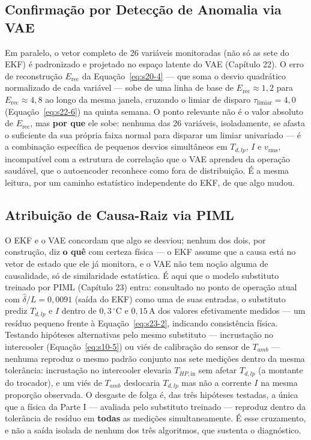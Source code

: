 \documentclass[12pt,a4paper]{article}
\numberwithin{equation}{section}
\numberwithin{table}{section}
\numberwithin{figure}{section}
\begin{document}
{\subsection{Confirmação por Detecção de Anomalia via VAE}

Em paralelo, o vetor completo de 26 variáveis monitoradas (não só as sete do EKF) é padronizado e projetado no espaço latente do VAE (Capítulo 22). O erro de reconstrução $E_{\text{rec}}$ da Equação~\eqref{eq:s20-4} — que soma o desvio quadrático normalizado de cada variável — sobe de uma linha de base de $E_{\text{rec}} \approx 1{,}2$ para $E_{\text{rec}} \approx 4{,}8$ ao longo da mesma janela, cruzando o limiar de disparo $\tau_{\text{limiar}} = 4{,}0$ (Equação~\eqref{eq:s22-6}) na quinta semana. O ponto relevante não é o valor absoluto de $E_{\text{rec}}$, mas \textbf{por que} ele sobe: nenhuma das 26 variáveis, isoladamente, se afasta o suficiente da sua própria faixa normal para disparar um limiar univariado — é a combinação específica de pequenos desvios simultâneos em $T_{d,lp}$, $I$ e $v_{\text{rms}}$, incompatível com a estrutura de correlação que o VAE aprendeu da operação saudável, que o autoencoder reconhece como fora de distribuição. É a mesma leitura, por um caminho estatístico independente do EKF, de que algo mudou.

\subsection{Atribuição de Causa-Raiz via PIML}

O EKF e o VAE concordam que algo se desviou; nenhum dos dois, por construção, diz \textbf{o quê} com certeza física — o EKF assume que a causa está no vetor de estado que ele já monitora, e o VAE não tem noção alguma de causalidade, só de similaridade estatística. É aqui que o modelo substituto treinado por PIML (Capítulo 23) entra: consultado no ponto de operação atual com $\hat\delta/L = 0{,}0091$ (saída do EKF) como uma de suas entradas, o substituto prediz $T_{d,lp}$ e $I$ dentro de $0{,}3\,^{\circ}\text{C}$ e $0{,}15\,\text{A}$ dos valores efetivamente medidos — um resíduo pequeno frente à Equação~\eqref{eq:s23-2}, indicando consistência física. Testando hipóteses alternativas pelo mesmo substituto — incrustação no intercooler (Equação~\eqref{eq:s10-5}) ou viés de calibração do sensor de $T_{amb}$ — nenhuma reproduz o mesmo padrão conjunto nas sete medições dentro da mesma tolerância: incrustação no intercooler elevaria $T_{HP,\text{in}}$ sem afetar $T_{d,lp}$ (a montante do trocador), e um viés de $T_{amb}$ deslocaria $T_{d,lp}$ mas não a corrente $I$ na mesma proporção observada. O desgaste de folga é, das três hipóteses testadas, a única que a física da Parte I — avaliada pelo substituto treinado — reproduz dentro da tolerância de resíduo em \textbf{todas} as medições simultaneamente. É esse cruzamento, e não a saída isolada de nenhum dos três algoritmos, que sustenta o diagnóstico.

}
\end{document}

